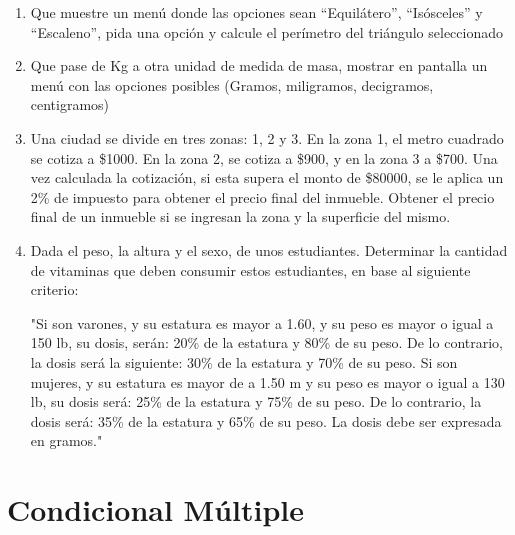 \begin{enumerate}[resume]
  \item Que muestre un menú donde las opciones sean “Equilátero”,
    “Isósceles” y “Escaleno”, pida una opción y calcule el perímetro del
    triángulo seleccionado
     
  \item Que pase de Kg a otra unidad de medida de masa, mostrar en
    pantalla un menú con las opciones posibles (Gramos, miligramos, decigramos,
    centigramos)
     
  \item Una ciudad se divide en tres zonas: 1, 2 y 3. En la zona
    1, el metro cuadrado se cotiza a \$1000. En la zona 2, se cotiza a \$900, y
    en la zona 3 a \$700. Una vez calculada la cotización, si esta supera el
    monto de \$80000, se le aplica un 2\% de impuesto para obtener el precio
    final del inmueble. Obtener el precio final de un inmueble si se ingresan
    la zona y la superficie del mismo.
     
  \item Dada el peso, la altura y el sexo, de unos estudiantes.
    Determinar la cantidad de vitaminas que deben consumir estos estudiantes,
    en base al siguiente criterio:
     
    "Si son varones, y su estatura es mayor a 1.60, y su peso es mayor o igual
    a 150 lb, su dosis, serán: 20\% de la estatura y 80\% de su peso. De lo
    contrario, la dosis será la siguiente: 30\% de la estatura y 70\% de su peso.
    Si son mujeres, y  su estatura es mayor de a 1.50 m y su peso es mayor o
    igual a 130 lb, su dosis será: 25\% de la estatura y 75\% de su peso. De lo
    contrario, la dosis será: 35\% de la estatura y 65\% de su peso. La dosis
    debe ser expresada en gramos."
     






\end{enumerate}



\section{Condicional M\'ultiple}

